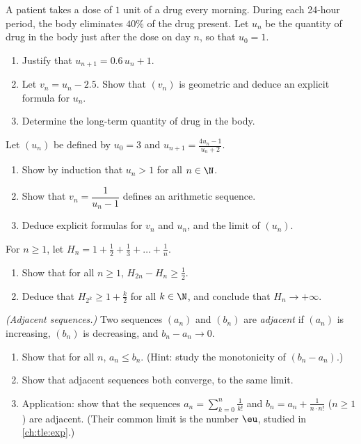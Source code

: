\begin{exercise}[$\star\star$]\label{exo:tle:seq:7}
A patient takes a dose of $1$ unit of a drug every morning. During each
24-hour period, the body eliminates $40\%$ of the drug present. Let $u_n$ be
the quantity of drug in the body just after the dose on day $n$, so that
$u_0 = 1$.
\begin{enumerate}
  \item Justify that $u_{n+1} = 0.6\,u_n + 1$.
  \item Let $v_n = u_n - 2.5$. Show that $(v_n)$ is geometric and deduce an
        explicit formula for $u_n$.
  \item Determine the long-term quantity of drug in the body.
\end{enumerate}
\end{exercise}

\begin{exercise}[$\star\star$]\label{exo:tle:seq:8}
Let $(u_n)$ be defined by $u_0 = 3$ and $u_{n+1} = \frac{4u_n - 1}{u_n + 2}$.
\begin{enumerate}
  \item Show by induction that $u_n > 1$ for all $n \in \N$.
  \item Show that $v_n = \dfrac{1}{u_n - 1}$ defines an arithmetic sequence.
  \item Deduce explicit formulas for $v_n$ and $u_n$, and the limit of
        $(u_n)$.
\end{enumerate}
\end{exercise}

\begin{exercise}[$\star\star\star$]\label{exo:tle:seq:9}
For $n \geq 1$, let
$H_n = 1 + \frac{1}{2} + \frac{1}{3} + \dots + \frac{1}{n}$.
\begin{enumerate}
  \item Show that for all $n \geq 1$, $H_{2n} - H_n \geq \frac{1}{2}$.
  \item Deduce that $H_{2^k} \geq 1 + \frac{k}{2}$ for all $k \in \N$, and
        conclude that $H_n \to +\infty$.
\end{enumerate}
\end{exercise}

\begin{exercise}[$\star\star\star$]\label{exo:tle:seq:10}
\emph{(Adjacent sequences.)} Two sequences $(a_n)$ and $(b_n)$ are
\emph{adjacent} if $(a_n)$ is increasing, $(b_n)$ is decreasing, and
$b_n - a_n \to 0$.
\begin{enumerate}
  \item Show that for all $n$, $a_n \leq b_n$. (Hint: study the monotonicity
        of $(b_n - a_n)$.)
  \item Show that adjacent sequences both converge, to the same limit.
  \item Application: show that the sequences
        $a_n = \sum_{k=0}^{n} \frac{1}{k!}$ and
        $b_n = a_n + \frac{1}{n \cdot n!}$ ($n \geq 1$) are adjacent. (Their
        common limit is the number $\eu$, studied in \cref{ch:tle:exp}.)
\end{enumerate}
\end{exercise}
